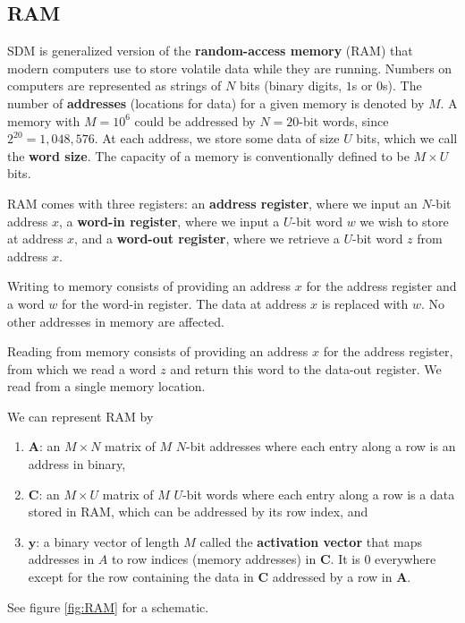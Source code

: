 \documentclass[journal, onecolumn, 12pt, draftclsnofoot]{IEEEtran}
\newcommand{\kword}[1]{\textbf{#1}}
\newcommand{\mbf}[1]{\mathbf{#1}}
\begin{document}
	\subsection{RAM}
	\par SDM is generalized version of the \kword{random-access memory} (RAM) that modern computers use to store volatile data while they are running. Numbers on computers are represented as strings of $N$ bits (binary digits, $1$s or $0$s). The number of \kword{addresses} (locations for data) for a given memory is denoted by $M$. A memory with $M=10^6$ could be addressed by $N = 20$-bit words, since $2^{20} = 1,048,576$. At each address, we store some data of size $U$ bits, which we call the \kword{word size}. The capacity of a memory is conventionally defined to be $M \times U$ bits.
	\par RAM comes with three registers: an \kword{address register}, where we input an $N$-bit address $x$, a \kword{word-in register}, where we input a $U$-bit word $w$ we wish to store at address $x$, and a \kword{word-out register}, where we retrieve a $U$-bit word $z$ from address $x$.
	\par Writing to memory consists of providing an address $x$ for the address register and a word $w$ for the word-in register. The data at address $x$ is replaced with $w$. No other addresses in memory are affected.
	\par Reading from memory consists of providing an address $x$ for the address register, from which we read a word $z$ and return this word to the data-out register. We read from a single memory location.
	\par We can represent RAM by
	\begin{enumerate}
		\item $\mbf{A}$: an $M \times N$ matrix of $M$ $N$-bit addresses where each entry along a row is an address in binary,
		\item $\mbf{C}$: an $M \times U$ matrix of $M$ $U$-bit words where each entry along a row is a data stored in RAM, which can be addressed by its row index, and
		\item $\mbf{y}$: a binary vector of length $M$ called the \kword{activation vector} that maps addresses in $A$ to row indices (memory addresses) in $\mbf{C}$. It is 0 everywhere except for the row containing the data in $\mbf{C}$ addressed by a row in $\mbf{A}$.
	\end{enumerate}
	See figure \ref{fig:RAM} for a schematic.
\end{document}
